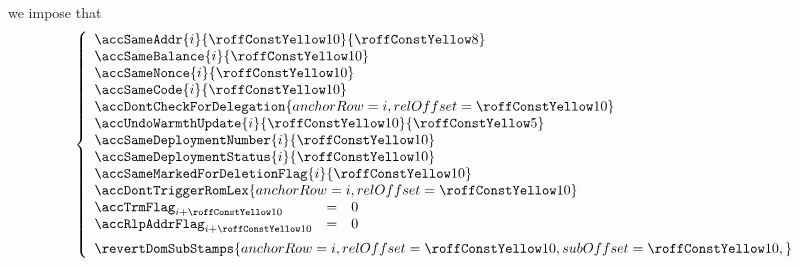 \item[\underline{\underline{Third \delegateName{} account-row $n^°(i + \callThirdDelegateOrCalleeAccountRowOffset)$:}}]
	we impose that
	\[
		\left\{ \begin{array}{lcl}
			\multicolumn{3}{l}{\accSameAddr                   {i}{\callThirdDelegateOrCalleeAccountRowOffset}{\callSecondDelegateOrCalleeAccountRowOffset}} \\
			\multicolumn{3}{l}{\accSameBalance                {i}{\callThirdDelegateOrCalleeAccountRowOffset}} \\
			\multicolumn{3}{l}{\accSameNonce                  {i}{\callThirdDelegateOrCalleeAccountRowOffset}} \\
			\multicolumn{3}{l}{\accSameCode                   {i}{\callThirdDelegateOrCalleeAccountRowOffset}} \\
			\multicolumn{3}{l}{\accDontCheckForDelegation     { anchorRow = i, relOffset = \callThirdDelegateOrCalleeAccountRowOffset }} \\
			\multicolumn{3}{l}{\accUndoWarmthUpdate           {i}{\callThirdDelegateOrCalleeAccountRowOffset}{\callFirstDelegateOrCalleeAccountRowOffset}} \\
			\multicolumn{3}{l}{\accSameDeploymentNumber       {i}{\callThirdDelegateOrCalleeAccountRowOffset}} \\
			\multicolumn{3}{l}{\accSameDeploymentStatus       {i}{\callThirdDelegateOrCalleeAccountRowOffset}} \\
			\multicolumn{3}{l}{\accSameMarkedForDeletionFlag  {i}{\callThirdDelegateOrCalleeAccountRowOffset}} \\
			\multicolumn{3}{l}{\accDontTriggerRomLex          { anchorRow = i, relOffset = \callThirdDelegateOrCalleeAccountRowOffset }} \\
			\accTrmFlag      _{i + \callThirdDelegateOrCalleeAccountRowOffset} & = & 0 \\
			\accRlpAddrFlag  _{i + \callThirdDelegateOrCalleeAccountRowOffset} & = & 0 \vspace{2mm} \\
			\multicolumn{3}{l}{
				\revertDomSubStamps {
					anchorRow = i                                          ,
					relOffset = \callThirdDelegateOrCalleeAccountRowOffset ,
					subOffset = \callThirdDelegateOrCalleeAccountRowOffset ,
				}
			} \\
		\end{array} \right.
	\]

